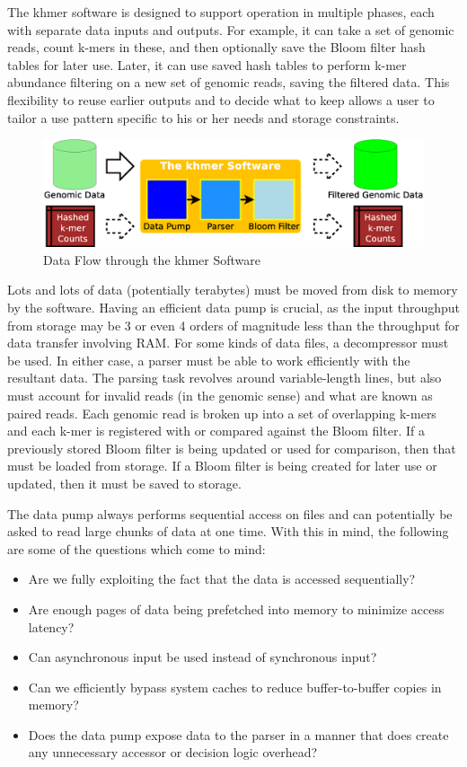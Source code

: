 \documentclass{article}
\begin{document}
The khmer software is designed to support operation in multiple phases, each with separate data inputs and outputs. For example, it can take a set of genomic reads, count k-mers in these, and then optionally save the Bloom filter hash tables for later use. Later, it can use saved hash tables to perform k-mer abundance filtering on a new set of genomic reads, saving the filtered data. This flexibility to reuse earlier outputs and to decide what to keep allows a user to tailor a use pattern specific to his or her needs and storage constraints.

\begin{figure}[ht!]
\centering
\includegraphics[scale=0.4]{data_flow.eps}
\caption{Data Flow through the khmer Software}
\label{khmerDataFlow}
\end{figure}

Lots and lots of data (potentially terabytes) must be moved from disk to memory by the software. Having an efficient data pump is crucial, as the input throughput from storage may be 3 or even 4 orders of magnitude less than the throughput for data transfer involving RAM. For some kinds of data files, a decompressor must be used. In either case, a parser must be able to work efficiently with the resultant data. The parsing task revolves around variable-length lines, but also must account for invalid reads (in the genomic sense) and what are known as paired reads. Each genomic read is broken up into a set of overlapping k-mers and each k-mer is registered with or compared against the Bloom filter. If a previously stored Bloom filter is being updated or used for comparison, then that must be loaded from storage. If a Bloom filter is being created for later use or updated, then it must be saved to storage.

The data pump always performs sequential access on files and can potentially be asked to read large chunks of data at one time. With this in mind, the following are some of the questions which come to mind:
\begin{itemize}
\item Are we fully exploiting the fact that the data is accessed sequentially?
\item Are enough pages of data being prefetched into memory to minimize access latency?
\item Can asynchronous input be used instead of synchronous input?
\item Can we efficiently bypass system caches to reduce buffer-to-buffer copies in memory?
\item Does the data pump expose data to the parser in a manner that does create any unnecessary accessor or decision logic overhead?
\end{itemize}
\end{document}
